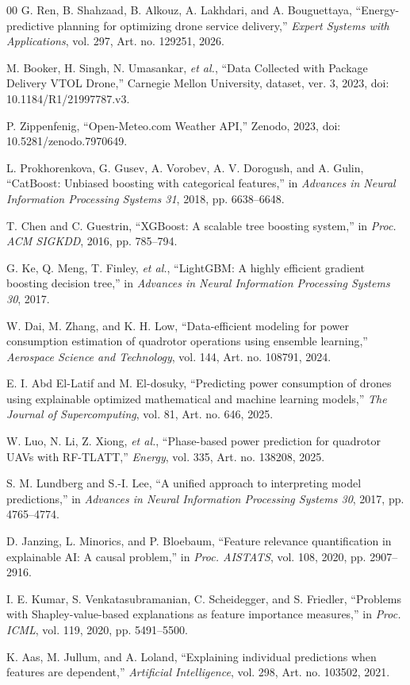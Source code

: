 \documentclass[conference,a4paper]{IEEEtran}
\begin{document}
\begin{thebibliography}{00}
 G. Ren, B. Shahzaad, B. Alkouz, A. Lakhdari, and A. Bouguettaya, ``Energy-predictive planning for optimizing drone service delivery,'' \emph{Expert Systems with Applications}, vol. 297, Art. no. 129251, 2026.

 M. Booker, H. Singh, N. Umasankar, \emph{et al.}, ``Data Collected with Package Delivery VTOL Drone,'' Carnegie Mellon University, dataset, ver. 3, 2023, doi: 10.1184/R1/21997787.v3.

 P. Zippenfenig, ``Open-Meteo.com Weather API,'' Zenodo, 2023, doi: 10.5281/zenodo.7970649.

 L. Prokhorenkova, G. Gusev, A. Vorobev, A. V. Dorogush, and A. Gulin, ``CatBoost: Unbiased boosting with categorical features,'' in \emph{Advances in Neural Information Processing Systems 31}, 2018, pp. 6638--6648.

 T. Chen and C. Guestrin, ``XGBoost: A scalable tree boosting system,'' in \emph{Proc. ACM SIGKDD}, 2016, pp. 785--794.

 G. Ke, Q. Meng, T. Finley, \emph{et al.}, ``LightGBM: A highly efficient gradient boosting decision tree,'' in \emph{Advances in Neural Information Processing Systems 30}, 2017.

 W. Dai, M. Zhang, and K. H. Low, ``Data-efficient modeling for power consumption estimation of quadrotor operations using ensemble learning,'' \emph{Aerospace Science and Technology}, vol. 144, Art. no. 108791, 2024.

 E. I. Abd El-Latif and M. El-dosuky, ``Predicting power consumption of drones using explainable optimized mathematical and machine learning models,'' \emph{The Journal of Supercomputing}, vol. 81, Art. no. 646, 2025.

 W. Luo, N. Li, Z. Xiong, \emph{et al.}, ``Phase-based power prediction for quadrotor UAVs with RF-TLATT,'' \emph{Energy}, vol. 335, Art. no. 138208, 2025.

 S. M. Lundberg and S.-I. Lee, ``A unified approach to interpreting model predictions,'' in \emph{Advances in Neural Information Processing Systems 30}, 2017, pp. 4765--4774.

 D. Janzing, L. Minorics, and P. Bloebaum, ``Feature relevance quantification in explainable AI: A causal problem,'' in \emph{Proc. AISTATS}, vol. 108, 2020, pp. 2907--2916.

 I. E. Kumar, S. Venkatasubramanian, C. Scheidegger, and S. Friedler, ``Problems with Shapley-value-based explanations as feature importance measures,'' in \emph{Proc. ICML}, vol. 119, 2020, pp. 5491--5500.

 K. Aas, M. Jullum, and A. Loland, ``Explaining individual predictions when features are dependent,'' \emph{Artificial Intelligence}, vol. 298, Art. no. 103502, 2021.

\end{thebibliography}
\end{document}
